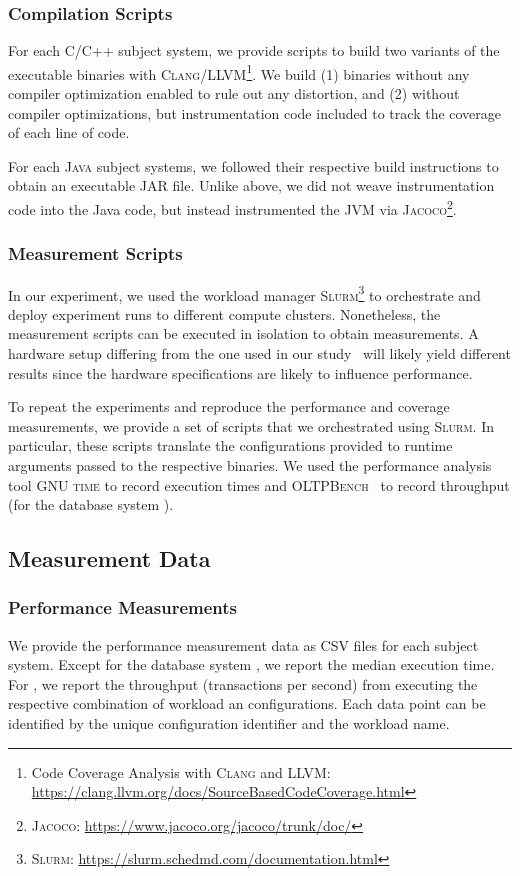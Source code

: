 {\subsubsection{Compilation Scripts} For each \textsc{C/C++} subject system, we provide scripts to build two variants of the executable binaries with \textsc{Clang/LLVM}\footnote{Code Coverage Analysis with \textsc{Clang} and \textsc{LLVM}: \url{https://clang.llvm.org/docs/SourceBasedCodeCoverage.html}}. We build (1) binaries without any compiler optimization enabled to rule out any distortion, and (2) without compiler optimizations, but instrumentation code included to track the coverage of each line of code. 

For each \textsc{Java} subject systems, we followed their respective build instructions to obtain an executable JAR file. Unlike above, we did not weave instrumentation code into the Java code, but instead instrumented the JVM via \textsc{Jacoco}\footnote{\textsc{Jacoco}: \url{https://www.jacoco.org/jacoco/trunk/doc/}}.

\subsubsection{Measurement Scripts} In our experiment, we used the workload manager \textsc{Slurm}\footnote{\textsc{Slurm}: \url{https://slurm.schedmd.com/documentation.html}} to orchestrate and deploy experiment runs to different compute clusters. Nonetheless, the measurement scripts can be executed in isolation to obtain measurements. A hardware setup differing from the one used in our study~\cite{muhlbauer_workload_2023} will likely yield different results since the hardware specifications are likely to influence performance. 

To repeat the experiments and reproduce the performance and coverage measurements, we provide a set of scripts that we orchestrated using \textsc{Slurm}. In particular, these scripts translate the configurations provided to runtime arguments passed to the respective binaries. We used the performance analysis tool \textsc{GNU time} to record execution times and \textsc{OLTPBench}~\cite{difallah_oltp_2013} to record throughput (for the database system \htwo).


\subsection{Measurement Data}
\subsubsection{Performance Measurements} 
We provide the performance measurement data as CSV files for each subject system. Except for the database system \htwo, we report the median execution time. For \htwo, we report the throughput (transactions per second) from executing the respective combination of workload an configurations. Each data point can be identified by the unique configuration identifier and the workload name.

}
